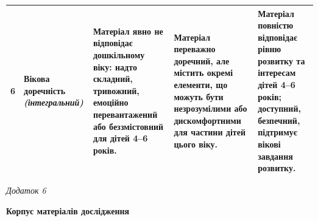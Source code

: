 \documentclass[14pt, a4paper]{extreport}
\begin{document}
\begin{longtable}{|p{0.4cm}|p{2.8cm}|p{3.4cm}|p{3.4cm}|p{3.4cm}|}
\hline
6 & Вікова доречність \newline\textit{(інтегральний)} & Матеріал явно не відповідає дошкільному віку: надто складний, тривожний, емоційно перевантажений або беззмістовний для дітей 4--6 років. & Матеріал переважно доречний, але містить окремі елементи, що можуть бути незрозумілими або дискомфортними для частини дітей цього віку. & Матеріал повністю відповідає рівню розвитку та інтересам дітей 4--6 років; доступний, безпечний, підтримує вікові завдання розвитку. \\
\hline
\end{longtable}
\endgroup

\newpage
\begin{flushright}\textit{Додаток 6}\end{flushright}
\begin{center}\textbf{Корпус матеріалів дослідження}\end{center}
\vspace{0.3cm}
\end{document}

